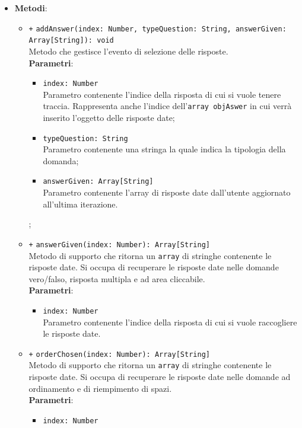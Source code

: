 \begin{itemize}
\begin{itemize}
	\end{itemize}
	\item \textbf{Metodi}: 
	\begin{itemize}
		\item \texttt{+} \texttt{addAnswer(index: Number, typeQuestion: String, answerGiven: Array[String]): void} \\
		Metodo che gestisce l'evento di selezione delle risposte. \\
		\textbf{Parametri}:
		\begin{itemize}
			\item \texttt{index: Number} \\
			Parametro contenente l'indice della risposta di cui si vuole tenere traccia. Rappresenta anche l'indice dell'\texttt{array objAswer} in cui verrà inserito l'oggetto delle risposte date;
			\item \texttt{typeQuestion: String} \\
			Parametro contenente una stringa la quale indica la tipologia della domanda;
			\item \texttt{answerGiven: Array[String]} \\
			Parametro contenente l'array di risposte date dall'utente aggiornato all'ultima iterazione.
		\end{itemize};
		\item \texttt{+} \texttt{answerGiven(index: Number): Array[String]} \\
		Metodo di supporto che ritorna un \texttt{array} di stringhe contenente le risposte date. Si occupa di recuperare le risposte date nelle domande vero/falso, risposta multipla e ad area cliccabile.\\
		\textbf{Parametri}:
		\begin{itemize}
			\item \texttt{index: Number} \\
			Parametro contenente l'indice della risposta di cui si vuole raccogliere le risposte date. 
		\end{itemize}
		\item \texttt{+} \texttt{orderChosen(index: Number): Array[String]} \\
		Metodo di supporto che ritorna un \texttt{array} di stringhe contenente le risposte date. Si occupa di recuperare le risposte date nelle domande ad ordinamento e di riempimento di spazi.\\
		\textbf{Parametri}:
		\begin{itemize}
			\item \texttt{index: Number} \\

\end{itemize}
\end{itemize}
\end{itemize}
